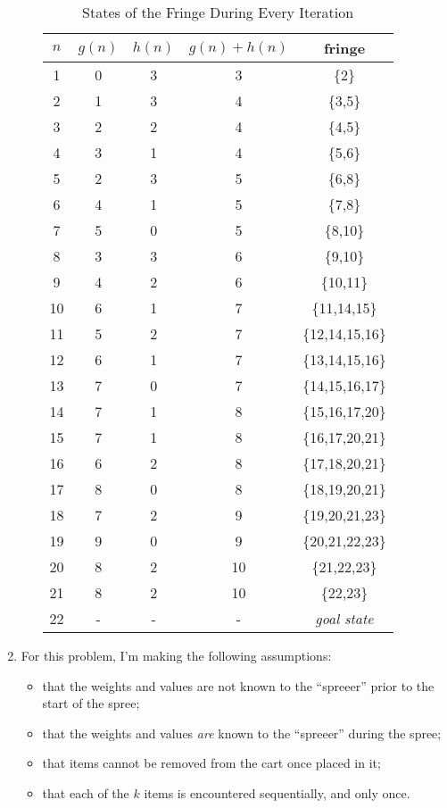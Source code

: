 \documentclass{article}
\begin{document}
\begin{enumerate}
\begin{enumerate}
\begin{table}[H]
\centering
\begin{tabular}{|c|c|c|c|c|}
\hline
$n$ & $g(n)$ & $h(n)$ & $g(n) + h(n)$ & fringe\\ \hline
\hline
1 & 0 & 3 & 3 & \{2\}\\\hline
2 & 1 & 3 & 4 & \{3,5\}\\\hline
3 & 2 & 2 & 4 & \{4,5\}\\\hline
4 & 3 & 1 & 4 & \{5,6\}\\\hline
5 & 2 & 3 & 5 & \{6,8\}\\\hline
6 & 4 & 1 & 5 & \{7,8\}\\\hline
7 & 5 & 0 & 5 & \{8,10\}\\\hline
8 & 3 & 3 & 6 & \{9,10\}\\\hline
9 & 4 & 2 & 6 & \{10,11\}\\\hline
10 & 6 & 1 & 7 & \{11,14,15\}\\\hline
11 & 5 & 2 & 7 & \{12,14,15,16\}\\\hline
12 & 6 & 1 & 7 & \{13,14,15,16\}\\\hline
13 & 7 & 0 & 7 & \{14,15,16,17\}\\\hline
14 & 7 & 1 & 8 & \{15,16,17,20\}\\\hline
15 & 7 & 1 & 8 & \{16,17,20,21\}\\\hline
16 & 6 & 2 & 8 & \{17,18,20,21\}\\\hline
17 & 8 & 0 & 8 & \{18,19,20,21\}\\\hline
18 & 7 & 2 & 9 & \{19,20,21,23\}\\\hline
19 & 9 & 0 & 9 & \{20,21,22,23\}\\\hline
20 & 8 & 2 & 10 & \{21,22,23\}\\\hline
21 & 8 & 2 & 10 & \{22,23\}\\\hline
22 & - & - & - & \emph{goal state}\\\hline
\end{tabular}
\caption{States of the Fringe During Every Iteration}
\end{table}


\end{enumerate}

\item{For this problem, I'm making the following assumptions: %

\begin{itemize}

\item that the weights and values are not known to the ``spreeer'' prior to the
start of the spree;
\item that the weights and values \emph{are} known to the ``spreeer'' during the spree;
\item that items cannot be removed from the cart once placed in it;
\item that each of the $k$ items is encountered sequentially, and only once.


\end{itemize}}
\end{enumerate}
\end{document}
